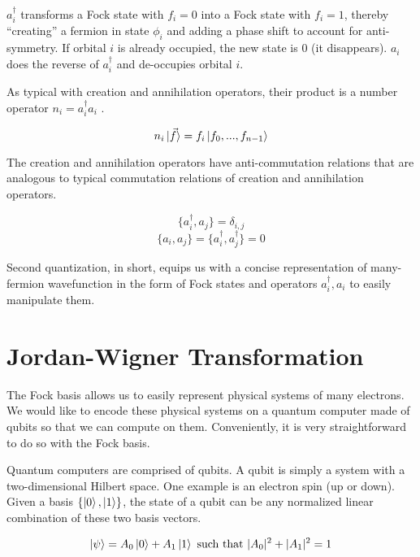 $a^\dag_i$ transforms a Fock state with $f_i = 0$ into a Fock state with $f_i = 1$, thereby ``creating'' a fermion in state $\phi_i$ and adding a phase shift to account for anti-symmetry. If orbital $i$ is already occupied, the new state is $0$ (it disappears). $a_i$ does the reverse of $a^\dag_i$ and de-occupies orbital $i$.

As typical with creation and annihilation operators, their product is a number operator $n_i = a^\dag_ia_i$ \cite{QCC}.

\begin{equation}
    n_i\ket{\vec{f}} = f_i\ket{f_0, ..., f_{n - 1}}
\end{equation}

The creation and annihilation operators have anti-commutation relations \cite{QCC} that are analogous to typical commutation relations of creation and annihilation operators.

\begin{equation}
    \{a^\dag_i, a_j\} = \delta_{i, j}
\end{equation}
\begin{equation}
    \{a_i, a_j\} = \{a^\dag_i, a^\dag_j\} = 0
\end{equation}

Second quantization, in short, equips us with a concise representation of many-fermion wavefunction in the form of Fock states and operators $a^\dag_i, a_i$ to easily manipulate them.

\section{Jordan-Wigner Transformation}

The Fock basis allows us to easily represent physical systems of many electrons. We would like to encode these physical systems on a quantum computer made of qubits so that we can compute on them. Conveniently, it is very straightforward to do so with the Fock basis.

Quantum computers are comprised of qubits. A qubit is simply a system with a two-dimensional Hilbert space. One example is an electron spin (up or down). Given a basis $\{\ket{0}, \ket{1}\}$, the state of a qubit can be any normalized linear combination of these two basis vectors.

\begin{equation}
    \ket{\psi} = A_0\ket{0} + A_1\ket{1} \text{ such that } |A_0|^2 + |A_1|^2 = 1
\end{equation}

